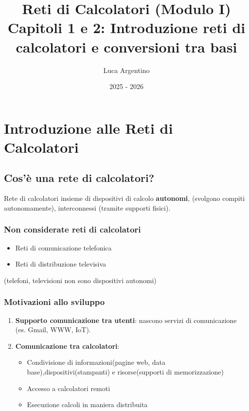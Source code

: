 \documentclass[a4paper,12pt]{report}
\title{Reti di Calcolatori  (Modulo I) \\ Capitoli 1 e 2: Introduzione reti di calcolatori e conversioni tra basi}
\author{Luca Argentino}
\date{2025 - 2026}
\begin{document}
              
\maketitle                    
\tableofcontents              
\newpage                      

\chapter{Introduzione alle Reti di Calcolatori}

\section{Cos’è una rete di calcolatori?}
\begin{defbox}{Rete di calcolatori}
 insieme di dispositivi di calcolo \textbf{autonomi}, (svolgono compiti autonomamente), interconnessi (tramite supporti fisici).
\end{defbox}

\subsection{Non considerate reti di calcolatori}
\begin{itemize}
  \item Reti di comunicazione telefonica
  \item Reti di distribuzione televisiva 
\end{itemize}
(telefoni, televisioni non sono dispositivi autonomi)

\subsection{Motivazioni allo sviluppo}
\begin{enumerate}
  \item \textbf{Supporto comunicazione tra utenti}: nascono servizi di comunicazione (es. Gmail, WWW, IoT).
  \item \textbf{Comunicazione tra calcolatori}: 
  \begin{itemize}
    \item Condivisione di informazioni(pagine web, data base),dispositivi(stampanti) e risorse(supporti di memorizzazione)
    \item Accesso a calcolatori remoti
    \item Esecuzione calcoli in maniera distribuita
  \end{itemize}
\end{enumerate}
\end{document}

